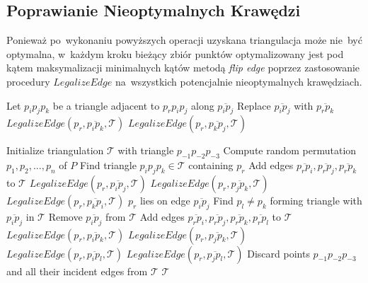 \documentclass[skorowidz,autorrok,backref,xodstep,oswiadczenie]{wmimgr}
\begin{document}
\subsection{Poprawianie Nieoptymalnych Krawędzi}

Ponieważ po~wykonaniu powyższych operacji uzyskana triangulacja może nie~być optymalna, w~każdym kroku bieżący zbiór punktów optymalizowany jest pod kątem maksymalizacji minimalnych kątów metodą \emph{flip edge} poprzez zastosowanie procedury $LegalizeEdge$ na~wszystkich potencjalnie nieoptymalnych krawędziach.

\begin{algorithm}
\caption{$LegalizeEdge(p_{r}, \overline{p_{i} p_{j}}, \mathcal{T})$ \cite{geometria}}
\label{LegalizeEdge}
\begin{algorithmic}
        \STATE Let $p_{i} p_{j} p_{k}$ be a triangle adjacent to $p_{r} p_{i} p_{j}$ along $\overline{p_{i} p_{j}}$
        \STATE Replace $\overline{p_{i} p_{j}}$ with $\overline{p_{r} p_{k}}$
        \STATE $LegalizeEdge(p_{r}, \overline{p_{i} p_{k}}, \mathcal{T})$
        \STATE $LegalizeEdge(p_{r}, \overline{p_{k} p_{j}}, \mathcal{T})$
    \ENDIF
\end{algorithmic}
\end{algorithm}

\begin{algorithm}
\caption{$DelaunayTriangulation(P)$ \cite{geometria}}
\label{DelaunayTriangulation}
\begin{algorithmic}
    \STATE Initialize triangulation $\mathcal{T}$ with triangle $p_{-1} p_{-2} p_{-3}$
    \STATE Compute random permutation $p_{1}, p_{2}, ..., p_{n}$ of $P$
        \STATE Find triangle $p_{i} p_{j} p_{k} \in \mathcal{T}$ containing $p_{r}$
            \STATE Add edges $\overline{p_{r} p_{i}}, \overline{p_{r} p_{j}}, \overline{p_{r} p_{k}}$ to $\mathcal{T}$
            \STATE $LegalizeEdge(p_{r}, \overline{p_{i} p_{j}}, \mathcal{T})$
            \STATE $LegalizeEdge(p_{r}, \overline{p_{j} p_{k}}, \mathcal{T})$
            \STATE $LegalizeEdge(p_{r}, \overline{p_{k} p_{i}}, \mathcal{T})$
        \ELSE
            \STATE $p_{r}$ lies on edge $\overline{p_{i} p_{j}}$
            \STATE Find $p_{l} \neq p_{k}$ forming triangle with $\overline{p_{i} p_{j}}$ in $\mathcal{T}$
            \STATE Remove $\overline{p_{i} p_{j}}$ from $\mathcal{T}$
            \STATE Add edges $\overline{p_{r} p_{i}}, \overline{p_{r} p_{j}}, \overline{p_{r} p_{k}}, \overline{p_{r} p_{l}}$ to $\mathcal{T}$
            \STATE $LegalizeEdge(p_{r}, \overline{p_{i} p_{k}}, \mathcal{T})$
            \STATE $LegalizeEdge(p_{r}, \overline{p_{j} p_{k}}, \mathcal{T})$
            \STATE $LegalizeEdge(p_{r}, \overline{p_{i} p_{l}}, \mathcal{T})$
            \STATE $LegalizeEdge(p_{r}, \overline{p_{j} p_{l}}, \mathcal{T})$
        \ENDIF
    \ENDFOR
    \STATE Discard points $p_{-1} p_{-2} p_{-3}$ and all their incident edges from $\mathcal{T}$
    \RETURN $\mathcal{T}$
\end{algorithmic}
\end{algorithm}
\end{document}
